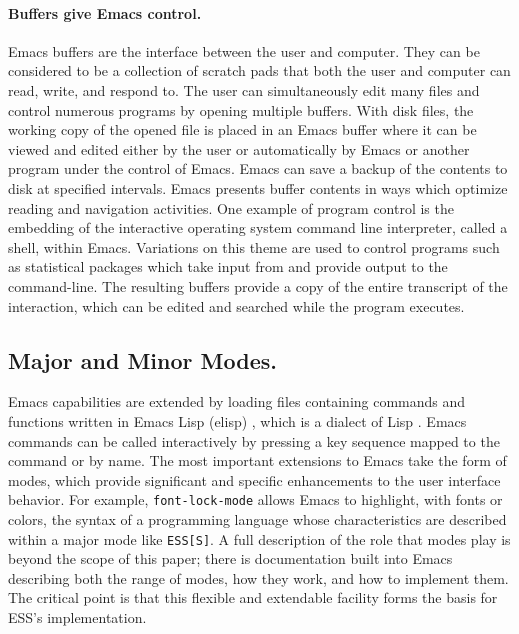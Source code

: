 \documentclass{article}
\newcommand{\stexttt}[1]{{\small\texttt{#1}}}
\begin{document}
\paragraph{Buffers give Emacs control.}
Emacs buffers are the interface between the user and computer.  They
can be considered to be a collection of scratch pads that both the
user and computer can read, write, and respond to.  The user can
simultaneously edit many files and control numerous programs by
opening multiple buffers.  With disk files, the working copy of the
opened file is placed in an Emacs buffer where it can be viewed and
edited either by the user or automatically by Emacs or another program
under the control of Emacs.  Emacs can save a backup of the contents
to disk at specified intervals.  Emacs presents buffer contents in
ways which optimize reading and navigation activities.  One example of
program control is the embedding of the interactive operating system
command line interpreter, called a shell, within Emacs.  Variations on
this theme are used to control programs such as statistical packages
which take input from and provide output to the command-line.  The
resulting buffers provide a copy of the entire transcript of the
interaction, which can be edited and searched while the program
executes.

\subsection{Major and Minor Modes.}
\label{sec:major:minor}
Emacs capabilities are extended by loading files containing commands
and functions written in Emacs Lisp (elisp) \citep{RChassell1999},
which is a dialect of Lisp \citep{PGraham:1996}.  Emacs commands can
be called interactively by pressing a key sequence mapped to the
command or by name.  The most important extensions to Emacs take the
form of modes, which provide significant and specific enhancements to
the user interface behavior.  For
example, \stexttt{font-lock-mode} allows Emacs to highlight, with
fonts or colors, the syntax of a programming language whose
characteristics are described within a major mode like
\stexttt{ESS[S]}.  A full description of the role that
modes play is beyond the scope of this paper; there is documentation
built into Emacs describing both the range of modes, how they work,
and how to implement them.  The critical point is that this flexible
and extendable facility forms the basis for ESS's implementation.
\end{document}
